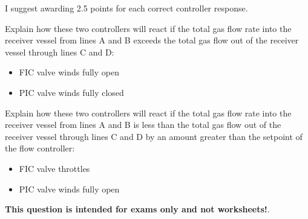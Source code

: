 
I suggest awarding 2.5 points for each correct controller response.

\vskip 10pt

Explain how these two controllers will react if the total gas flow rate into the receiver vessel from lines A and B exceeds the total gas flow out of the receiver vessel through lines C and D:

\begin{itemize}
\item{} FIC valve winds fully open
\item{} PIC valve winds fully closed
\end{itemize}

\vskip 10pt

Explain how these two controllers will react if the total gas flow rate into the receiver vessel from lines A and B is less than the total gas flow out of the receiver vessel through lines C and D by an amount greater than the setpoint of the flow controller: 

\begin{itemize}
\item{} FIC valve throttles
\item{} PIC valve winds fully open
\end{itemize}









{\bf This question is intended for exams only and not worksheets!}.




